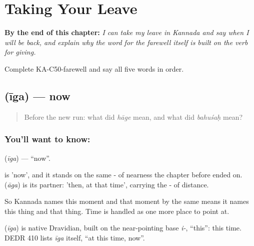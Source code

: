 
\chapter{Taking Your Leave}
\label{ch:ka-leave-more}

\begin{chapteropening}
\textbf{By the end of this chapter:} \emph{I can take my leave in Kannada and say when I will be back, and explain why the word for the farewell itself is built on the verb for giving.}

Complete KA-C50-farewell and say all five words in order.
\end{chapteropening}

\section[\texorpdfstring{\kn{ಈಗ} (īga)}{ಈಗ (īga)}]{ (īga) — now}

\label{lesson:KA-C50-now}



\begin{quote}
Before the new run: what did \emph{hāge} mean, and what did \emph{bahuśaḥ} mean?
\end{quote}

\subsection*{You'll want to know: }
\textbf{} (\emph{īga}) — \textquotedblleft{}now\textquotedblright{}.

 is 'now', and it stands on the same - of nearness the chapter before ended on.  (\emph{āga}) is its partner: 'then, at that time', carrying the - of distance.

So Kannada names this moment and that moment by the same means it names this thing and that thing. Time is handled as one more place to point at.

\begin{cousinweb}
\textbf{} (\emph{īga}) is native Dravidian, built on the near-pointing base \emph{i-}, \textquotedblleft{}this\textquotedblright{}: this time. DEDR 410 lists \emph{īga} itself, \textquotedblleft{}at this time, now\textquotedblright{}.
\end{cousinweb}

